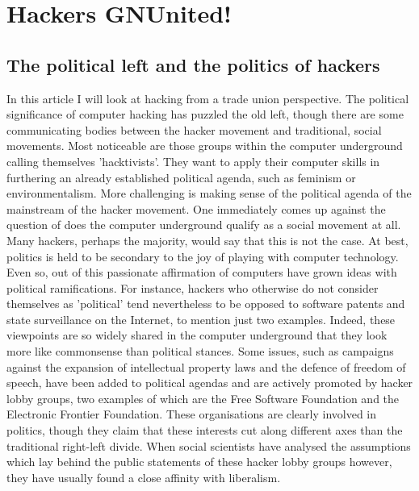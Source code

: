 \begin{savequote}
\end{savequote}
\chapter{Hackers GNUnited!}
\label{c:hackers_gnunited}

\section{The political left and the politics of hackers}
\label{s:hackers_gnunited-political_left}

In this article I will look at hacking from a trade union perspective. The
political signif\hbox{}icance of computer hacking has puzzled the old left,
though there are some communicating bodies between the hacker movement and
traditional, social movements. Most noticeable are those groups within the
computer underground calling themselves 'hacktivists'. They want to apply their
computer skills in furthering an already established political agenda, such as
feminism or environmentalism\cite{gnunited-jordan02}. More challenging is making
sense of the political agenda of the mainstream of the hacker movement. One
immediately comes up against the question of does the computer underground
qualify as a social movement at all. Many hackers, perhaps the majority, would
say that this is not the case. At best, politics is held to be secondary to the
joy of playing with computer technology\cite{gnunited-torvalds_diamond01}. Even
so, out of this passionate af\hbox{}f\hbox{}irmation of computers have grown
ideas with political ramif\hbox{}ications. For instance, hackers who otherwise
do not consider themselves as 'political' tend nevertheless to be opposed to
software patents and state surveillance on the Internet, to mention just two
examples.  Indeed, these viewpoints are so widely shared in the computer
underground that they look more like commonsense than political stances. Some
issues, such as campaigns against the expansion of intellectual property laws
and the defence of freedom of speech, have been added to political agendas and
are actively promoted by hacker lobby groups, two examples of which are the Free
Software Foundation and the Electronic Frontier Foundation. These organisations
are clearly involved in politics, though they claim that these interests cut
along dif\hbox{}ferent axes than the traditional right-left divide. When social
scientists have analysed the assumptions which lay behind the public statements
of these hacker lobby groups however, they have usually found a close
af\hbox{}f\hbox{}inity with liberalism\cite{gnunited-coleman08}. 


